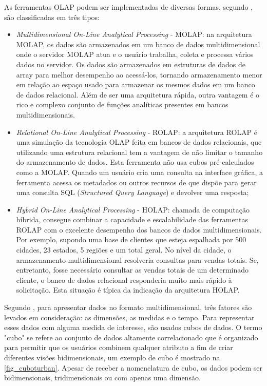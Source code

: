 As ferramentas OLAP podem ser implementadas de diversas formas, segundo , são classificadas em três tipos:
\begin{itemize}
    \item \textit{Multidimensional On-Line Analytical Processing} - MOLAP: na arquitetura MOLAP, os dados são armazenados em um banco de dados multidimensional onde o servidor MOLAP atua e o usuário trabalha, coleta e processa vários dados no servidor. Os dados são armazenados em estruturas de dados de array para melhor desempenho ao acessá-los, tornando armazenamento menor em relação ao espaço usado para armazenar os mesmos dados em um banco de dados relacional. Além de ser uma arquitetura rápida, outra vantagem é o rico e complexo conjunto de funções analíticas presentes em bancos multidimensionais.
    \item \textit{Relational On-Line Analytical Processing} - ROLAP: a arquitetura ROLAP é uma simulação da tecnologia OLAP feita em bancos de dados relacionais, que utilizando uma estrutura relacional tem a vantagem de não limitar o tamanho do armazenamento de dados. Esta ferramenta não usa cubos pré-calculados como a MOLAP. Quando um usuário cria uma consulta na interface gráfica, a ferramenta acessa os metadados ou outros recursos de que dispõe para gerar uma consulta SQL (\textit{Structured Query Language}) e devolver uma resposta;
    \item \textit{Hybrid On-Line Analytical Processing} - HOLAP: chamada de computação híbrida, consegue combinar a capacidade e escalabilidade das ferramentas ROLAP com o excelente desempenho dos bancos de dados multidimensionais. Por exemplo, supondo uma base de clientes que esteja espalhada por 500 cidades, 23 estados, 5 regiões e um total geral. No nível da cidade, o armazenamento multidimensional resolveria consultas para vendas totais. Se, entretanto, fosse necessário consultar as vendas totais de um determinado cliente, o banco de dados relacional responderia muito mais rápido à solicitação. Esta situação é típica da indicação da arquitetura HOLAP.
\end{itemize}

Segundo , para apresentar dados no formato multidimensional, três fatores são levados em consideração: as dimensões, as medidas e o tempo. Para representar esses dados com alguma medida de interesse, são usados cubos de dados. O termo "cubo" se refere ao conjunto de dados altamente correlacionado que é organizado para permitir que os usuários combinem qualquer atributo a fim de criar diferentes visões bidimensionais, um exemplo de cubo é mostrado na \autoref{fig_cuboturban}. Apesar de receber a nomenclatura de cubo, os dados podem ser bidimensionais, tridimensionais ou com apenas uma dimensão.


